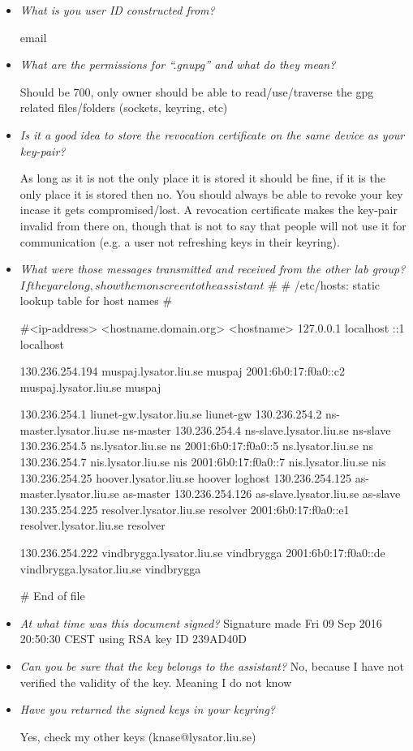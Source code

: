 
\begin{itemize}
\item{\textit{What is you user ID constructed from?}

    email
  }
\item{\textit{What are the permissions for ``.gnupg'' and what do they mean?}

    Should be 700, only owner should be able to read/use/traverse the gpg related
    files/folders (sockets, keyring, etc)
  }
\item{\textit{Is it a good idea to store the revocation certificate on the same
      device as your key-pair?}

    As long as it is not the only place it is stored it should be fine, if it is
    the only place it is stored then no. You should always be able to revoke
    your key incase it gets compromised/lost. A revocation certificate makes the
    key-pair invalid from there on, though that is not to say that people will
    not use it for communication (e.g. a user not refreshing keys in their
    keyring). 
  }
\item{\textit{What were those messages transmitted and received from the
other lab group? \(If they are long, show them onscreen to the assistant\)}
#
# /etc/hosts: static lookup table for host names
#

#<ip-address>	<hostname.domain.org>	<hostname>
127.0.0.1		localhost
::1			localhost

130.236.254.194		muspaj.lysator.liu.se	muspaj
2001:6b0:17:f0a0::c2	muspaj.lysator.liu.se	muspaj

130.236.254.1		liunet-gw.lysator.liu.se	liunet-gw
130.236.254.2		ns-master.lysator.liu.se	ns-master
130.236.254.4		ns-slave.lysator.liu.se		ns-slave
130.236.254.5		ns.lysator.liu.se		ns
2001:6b0:17:f0a0::5	ns.lysator.liu.se		ns
130.236.254.7		nis.lysator.liu.se		nis
2001:6b0:17:f0a0::7	nis.lysator.liu.se		nis
130.236.254.25		hoover.lysator.liu.se		hoover loghost
130.236.254.125		as-master.lysator.liu.se	as-master
130.236.254.126		as-slave.lysator.liu.se		as-slave
130.235.254.225		resolver.lysator.liu.se		resolver
2001:6b0:17:f0a0::e1	resolver.lysator.liu.se		resolver

130.236.254.222 vindbrygga.lysator.liu.se vindbrygga
2001:6b0:17:f0a0::de vindbrygga.lysator.liu.se vindbrygga

# End of file


    
  }
\item{\textit{At what time was this document signed?}
        Signature made Fri 09 Sep 2016 20:50:30 CEST using RSA key ID 239AD40D
    
  }
\item{\textit{Can you be sure that the key belongs to the assistant?}
    No, because I have not verified the validity of the key. Meaning I do not
    know 
  }
\item{\textit{Have you returned the signed keys in your keyring?}

    Yes, check my other keys (knase@lysator.liu.se)
    
}


\end{itemize}